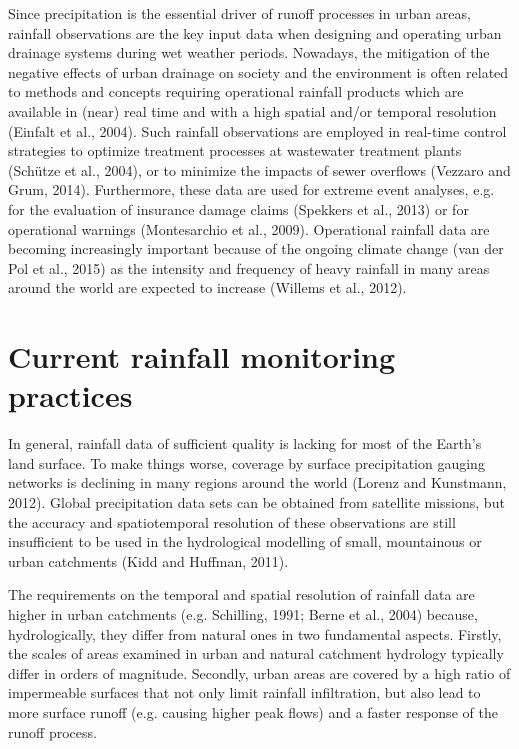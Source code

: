 \documentclass{ctuthesis}\usepackage[]{graphicx}\usepackage[]{color}
\begin{document}
Since precipitation is the essential driver of runoff processes in urban areas, rainfall observations are the key input data when designing and operating urban drainage systems during wet weather periods. Nowadays, the mitigation of the negative effects of urban drainage on society and the environment is often related to methods and concepts requiring operational rainfall products which are available in (near) real time and with a high spatial and/or temporal resolution (Einfalt et al., 2004). Such rainfall observations are employed in real-time control strategies to optimize treatment processes at wastewater treatment plants (Schütze et al., 2004), or to minimize the impacts of sewer overflows (Vezzaro and Grum, 2014). Furthermore, these data are used for extreme event analyses, e.g. for the evaluation of insurance damage claims (Spekkers et al., 2013) or for operational warnings (Montesarchio et al., 2009). Operational rainfall data are becoming increasingly important because of the ongoing climate change (van der Pol et al., 2015) as the intensity and frequency of heavy rainfall in many areas around the world are expected to increase (Willems et al., 2012).


\section{Current rainfall monitoring practices}

In general, rainfall data of sufficient quality is lacking for most of the Earth’s land surface. To make things worse, coverage by surface precipitation gauging networks is declining in many regions around the world (Lorenz and Kunstmann, 2012). Global precipitation data sets can be obtained from satellite missions, but the accuracy and spatiotemporal resolution of these observations are still insufficient to be used in the hydrological modelling of small, mountainous or urban catchments (Kidd and Huffman, 2011).

The requirements on the temporal and spatial resolution of rainfall data are higher in urban catchments (e.g. Schilling, 1991; Berne et al., 2004) because, hydrologically, they differ from natural ones in two fundamental aspects. Firstly, the scales of areas examined in urban and natural catchment hydrology typically differ in orders of magnitude. Secondly, urban areas are covered by a high ratio of impermeable surfaces that not only limit rainfall infiltration, but also lead to more surface runoff (e.g. causing higher peak flows) and a faster response of the runoff process.
\end{document}
